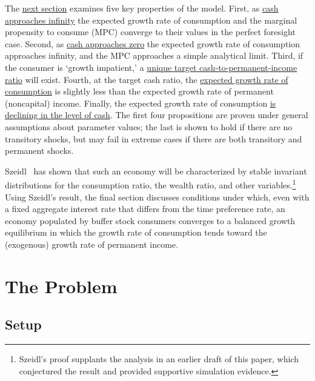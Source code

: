 \documentclass[BufferStockTheory]{subfiles}
\begin{document}
The \hyperlink{AnalysisoftheConvergedConsumptionFunction}{next section} examines five key properties of the model. First, as \hyperlink{LimitsAsmtToInfty}{cash approaches infinity} the expected growth rate of consumption and the marginal propensity to consume (MPC) converge to their values in the perfect foresight case. Second, as \hyperlink{LimitsAsmtToZero}{cash approaches zero} the expected growth rate of consumption approaches infinity, and the MPC approaches a simple analytical limit.  Third, if the consumer is `growth impatient,' a \hyperlink{onetarget}{unique target cash-to-permanent-income ratio} will exist.  Fourth, at the target cash ratio, the \hyperlink{cGroLTpGro}{expected growth rate of consumption} is slightly less than the expected growth rate of permanent (noncapital) income.  Finally, the expected growth rate of consumption \hyperlink{dcgdxneg}{is declining in the level of cash}. The first four propositions are proven under general assumptions about parameter values; the last is shown to hold if there are no transitory shocks, but may fail in extreme cases if there are both transitory and permanent shocks.

Szeidl~\citeyearpar{szeidlInvariant} has shown that such an economy will be characterized by stable invariant distributions for the consumption ratio, the wealth ratio, and other variables.\footnote{Szeidl's proof supplants the analysis in an earlier draft of this paper, which conjectured the result and provided supportive simulation evidence.}  Using Szeidl's result, the final section discusses conditions under which, even with a fixed aggregate interest rate that differs from the time preference rate, an economy populated by buffer stock consumers converges to a balanced growth equilibrium in which the growth rate of consumption tends toward the (exogenous) growth rate of permanent income.

\hypertarget{The-Problem}{}
\section{The Problem}

\subsection{Setup}
\label{subsec:Setup}
\end{document}
